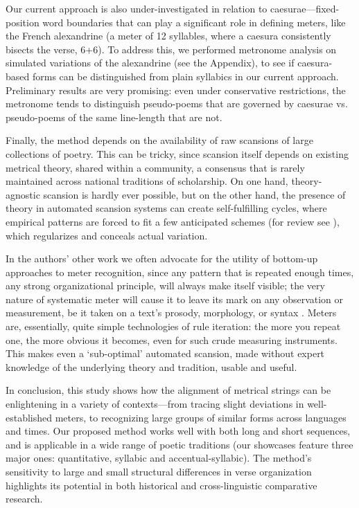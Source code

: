 \documentclass[
    hf
]{ceurart}
\begin{document}
Our current approach is also under-investigated in relation to caesurae---fixed-position word boundaries that can play a significant role in defining meters, like the French alexandrine (a meter of 12 syllables, where a caesura consistently bisects the verse, 6+6). To address this, we performed metronome analysis on simulated variations of the alexandrine (see the Appendix), to see if caesura-based forms can be distinguished from plain syllabics in our current approach. Preliminary results are very promising: even under conservative restrictions, the metronome tends to distinguish pseudo-poems that are governed by caesurae vs. pseudo-poems of the same line-length that are not.

Finally, the method depends on the availability of raw scansions of large collections of poetry. This can be tricky, since scansion itself depends on existing metrical theory, shared within a community, a consensus that is rarely maintained across national traditions of scholarship. On one hand, theory-agnostic scansion is hardly ever possible, but on the other hand, the presence of theory in automated scansion systems can create self-fulfilling cycles, where empirical patterns are forced to fit a few anticipated schemes (for review see \cite{de_sisto_understanding_2024}), which regularizes and conceals actual variation.

In the authors' other work we often advocate for the utility  of bottom-up approaches to meter recognition, since any
pattern that is repeated enough times, any strong organizational principle, will always make itself visible; the very
nature of systematic meter will cause it to leave its mark on any observation or measurement, be it taken on a text's
prosody, morphology, or syntax \cite{gasparov_linguistics_2008}. Meters are, essentially, quite simple technologies of
rule iteration: the more you repeat one, the more obvious it becomes, even for such crude measuring instruments. This
makes even a `sub-optimal' automated scansion, made without expert knowledge of the underlying theory and tradition,
usable and useful.

In conclusion, this study shows how the alignment of metrical strings can be enlightening in a variety of contexts---from tracing slight deviations in well-established meters, to recognizing large groups of similar forms across languages and times. Our proposed method works well with both long and short sequences, and is applicable in a wide range of poetic traditions (our showcases feature three major ones: quantitative, syllabic and accentual-syllabic). The method's sensitivity to large and small structural differences in verse organization highlights its potential in both historical and cross-linguistic comparative research.
\end{document}
